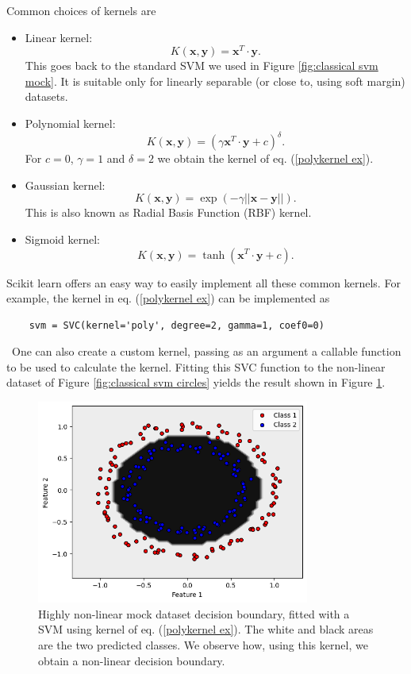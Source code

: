 \documentclass[12pt]{article}
\begin{document}
Common choices of kernels are
\begin{itemize}
    \item Linear kernel: $$K(\mathbf{x},\mathbf{y})=\mathbf{x}^T\cdot\mathbf{y}.$$ This goes back to the standard SVM we used in Figure \ref{fig:classical svm mock}. It is suitable only for linearly separable (or close to, using soft margin) datasets.
    \item Polynomial kernel: $$K(\mathbf{x},\mathbf{y})=(\gamma\mathbf{x}^T\cdot\mathbf{y}+c)^\delta.$$ For $c=0$, $\gamma=1$ and $\delta=2$ we obtain the kernel of eq. (\ref{polykernel ex}). 
    \item Gaussian kernel: $$K(\mathbf{x},\mathbf{y})=\exp(-\gamma||\mathbf{x}-\mathbf{y}||).$$ This is also known as Radial Basis Function (RBF) kernel. 
    \item Sigmoid kernel: $$K(\mathbf{x},\mathbf{y})=\tanh(\mathbf{x}^T\cdot\mathbf{y}+c).$$
\end{itemize}
Scikit learn offers an easy way to easily implement all these common kernels. For example, the kernel in eq. (\ref{polykernel ex}) can be implemented as 
\begin{lstlisting}
    svm = SVC(kernel='poly', degree=2, gamma=1, coef0=0)
\end{lstlisting}\
One can also create a custom kernel, passing as an argument a callable function to be used to calculate the kernel. Fitting this SVC function to the non-linear dataset of Figure \ref{fig:classical svm circles} yields the result shown in Figure \ref{fig:classical svm circle decision boundary}. 
\begin{figure}[h!]
    \centering
    \includegraphics[width=0.8\textwidth]{images/circlesclassicaldecisionboundary.png}
    \caption{Highly non-linear mock dataset decision boundary, fitted with a SVM using kernel of eq. (\ref{polykernel ex}). The white and black areas are the two predicted classes. We observe how, using this kernel, we obtain a non-linear decision boundary.}
    \label{fig:classical svm circle decision boundary}
\end{figure}
\end{document}
